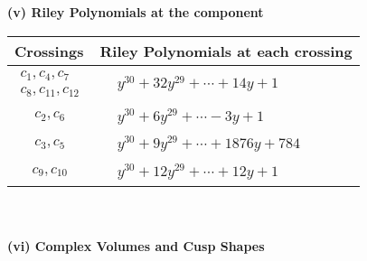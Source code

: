 \documentclass[1p]{elsarticle_modified}
\theoremstyle{definition}
\begin{document}
\newpage\renewcommand{\arraystretch}{1}
\flushleft \textbf{(v) Riley Polynomials at the component}\newline \\
\begin{tabular}{m{50pt}|m{274pt}}
Crossings & \hspace{64pt}Riley Polynomials at each crossing \\
\hline $$\begin{aligned}c_{1},c_{4},c_{7}\\c_{8},c_{11},c_{12}\end{aligned}$$&$\begin{aligned}
&y^{30}+32 y^{29}+\cdots+14 y+1
\end{aligned}$\\
\hline $$\begin{aligned}c_{2},c_{6}\end{aligned}$$&$\begin{aligned}
&y^{30}+6 y^{29}+\cdots-3 y+1
\end{aligned}$\\
\hline $$\begin{aligned}c_{3},c_{5}\end{aligned}$$&$\begin{aligned}
&y^{30}+9 y^{29}+\cdots+1876 y+784
\end{aligned}$\\
\hline $$\begin{aligned}c_{9},c_{10}\end{aligned}$$&$\begin{aligned}
&y^{30}+12 y^{29}+\cdots+12 y+1
\end{aligned}$\\
\hline
\end{tabular}\\~\\
\newpage\flushleft \textbf{(vi) Complex Volumes and Cusp Shapes}
\end{document}
